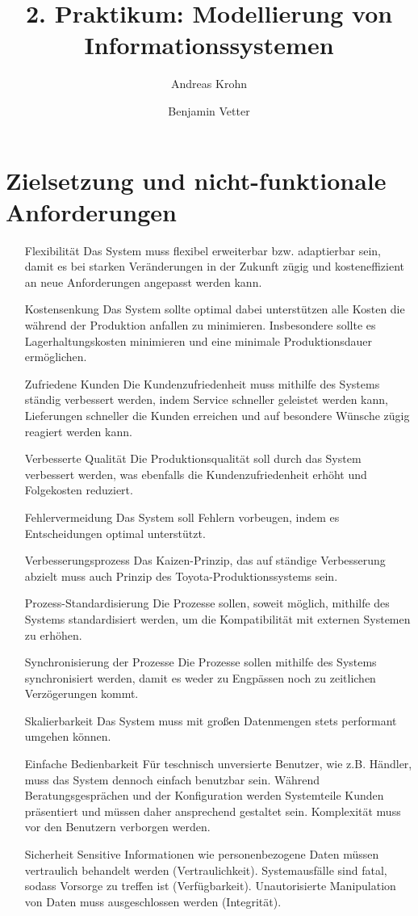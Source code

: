 \documentclass[a4paper,10pt,left=4.5cm,right=3cm,top=1cm,bottom=2cm]{article}
\title{2. Praktikum: Modellierung von Informationssystemen}
\author{Andreas Krohn \and Benjamin Vetter}
\begin{document}
\maketitle

\tableofcontents

\section{Zielsetzung und nicht-funktionale Anforderungen}

\begin{itemize}
  \item[Flexibilität] Das System muss flexibel erweiterbar bzw. adaptierbar sein, damit es bei starken Veränderungen in der Zukunft zügig und kosteneffizient an neue Anforderungen angepasst werden kann.
  \item[Kostensenkung] Das System sollte optimal dabei unterstützen alle Kosten die während der Produktion anfallen zu minimieren.
Insbesondere sollte es Lagerhaltungskosten minimieren und eine minimale Produktionsdauer ermöglichen.
  \item[Zufriedene Kunden] Die Kundenzufriedenheit muss mithilfe des Systems ständig verbessert werden, indem Service schneller geleistet werden kann, Lieferungen schneller die Kunden erreichen und auf besondere Wünsche zügig reagiert werden kann.
  \item[Verbesserte Qualität] Die Produktionsqualität soll durch das System verbessert werden, was ebenfalls die Kundenzufriedenheit erhöht und Folgekosten reduziert.
  \item[Fehlervermeidung] Das System soll Fehlern vorbeugen, indem es Entscheidungen optimal unterstützt.
  \item[Verbesserungsprozess] Das Kaizen-Prinzip, das auf ständige Verbesserung abzielt muss auch Prinzip des Toyota-Produktionssystems sein.
  \item[Prozess-Standardisierung] Die Prozesse sollen, soweit möglich, mithilfe des Systems standardisiert werden, um die Kompatibilität mit externen Systemen zu erhöhen.
  \item[Synchronisierung der Prozesse] Die Prozesse sollen mithilfe des Systems synchronisiert werden, damit es weder zu Engpässen noch zu zeitlichen Verzögerungen kommt.
  \item[Skalierbarkeit] Das System muss mit großen Datenmengen stets performant umgehen können.
  \item[Einfache Bedienbarkeit] Für teschnisch unversierte Benutzer, wie z.B. Händler, muss das System dennoch einfach benutzbar sein. 
Während Beratungsgesprächen und der Konfiguration werden Systemteile Kunden präsentiert und müssen daher ansprechend gestaltet sein.
Komplexität muss vor den Benutzern verborgen werden.
  \item[Sicherheit] Sensitive Informationen wie personenbezogene Daten müssen vertraulich behandelt werden (Vertraulichkeit). 
Systemausfälle sind fatal, sodass Vorsorge zu treffen ist (Verfügbarkeit). 
Unautorisierte Manipulation von Daten muss ausgeschlossen werden (Integrität).
\end{itemize}
\end{document}
